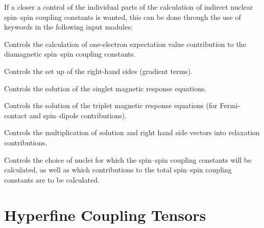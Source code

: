 If a closer a control of the individual parts of the calculation of
indirect nuclear spin--spin coupling constants is wanted, this can be
done through the use of keywords in the following input modules:

\begin{list}{}{\itemsep 0.10cm \parsep 0.0cm}
\item[\Sec{EXPECT}] Controls the calculation of one-electron
expectation value contribution to the diamagnetic spin--spin coupling
constants.
\item[\Sec{GETSGY}] Controls the set up of the right-hand sides
(gradient terms).
\item[\Sec{LINRES}] Controls the solution of the singlet magnetic
response equations.
\item[\Sec{TRPRSP}] Controls the solution of the triplet magnetic
response equations (for Fermi-contact and spin--dipole contributions).
\item[\Sec{RELAX}] Controls the multiplication of solution and right hand
side vectors into relaxation contributions.
\item[\Sec{SPIN-S}] Controls the choice of nuclei for which the
spin--spin coupling constants will be calculated, as well as which
contributions to the total spin--spin coupling constants are to be
calculated.
\end{list}

\section{Hyperfine Coupling Tensors}

\begin{center}
\end{center}

